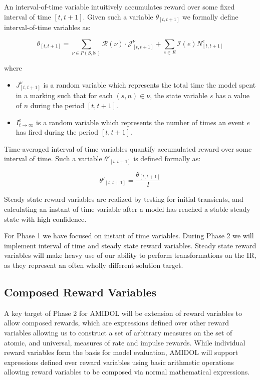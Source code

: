 \documentclass[11pt]{article}
\newcommand{\amidol}{\textsc{AMIDOL}}
\begin{document}
An interval-of-time variable intuitively accumulates reward over some fixed interval of time $[t, t+1]$.  Given such a variable $\theta_{[t, t+1]}$ we formally define interval-of-time variables as:

\[\theta_{[t,t+1]} = \sum_{\nu \in P(S, \mathbb{N})} \mathcal{R}(\nu) \cdot \mathcal{J}^{\nu}_{[t, t+1]} + \sum_{e \in E} \mathcal{I}(e)N^e_{[t,t+1]}\]

where

\begin{itemize}
\item $J^{\nu}_{[t,t+1]}$ is a random variable which represents the total time the model spent in a marking such that for each $(s, n) \in \nu$, the state variable $s$ has a value of $n$ during the period $[t, t+1]$.
\item $I^e_{t\rightarrow\infty}$ is a random variable which represents the number of times an event $e$ has fired during the period $[t, t+1]$.
\end{itemize}

Time-averaged interval of time variables quantify accumulated reward over some interval of time.  Such a variable $\theta'_{[t,t+1]}$ is defined formally as:

\[\theta'_{[t,t+1]} = \frac{\theta_{[t,t+1]}}{l}\]

Steady state reward variables are realized by testing for initial transients, and calculating an instant of time variable after a model has reached a stable steady state with high confidence.

For Phase 1 we have focused on instant of time variables.  During Phase 2 we will implement interval of time and steady state reward variables.  Steady state reward variables will make heavy use of our ability to perform transformations on the IR, as they represent an often wholly different solution target.

\subsection{Composed Reward Variables}

A key target of Phase 2 for \amidol{} will be extension of reward variables to allow composed rewards, which are expressions defined over other reward variables allowing us to construct a set of arbitrary measures on the set of atomic, and universal, measures of rate and impulse rewards. While individual reward variables form the basis for model evaluation, \amidol{} will support expressions defined over reward variables using basic arithmetic operations allowing reward variables to be composed via normal mathematical expressions.
\end{document}
